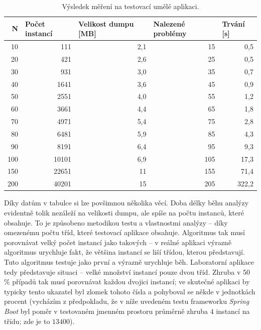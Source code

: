 \begin{table}[ht!]
    \begin{tabular}{|r|r|r|r|r|}
        \hline
    \multicolumn{1}{|r|}{\textbf{N}} & \multicolumn{1}{l|}{\textbf{Počet instancí}} & \multicolumn{1}{l|}{\textbf{Velikost dumpu {[}MB{]}}} & \multicolumn{1}{l|}{\textbf{Nalezené problémy}} & \multicolumn{1}{l|}{\textbf{Trvání {[}s{]}}} \\ \hline\hline
    10 & 111   & 2,1     & 15  & 0,5   \\ \hline
    20 & 421   & 2,6     & 25  & 0,5   \\ \hline
    30 & 931   & 3,0     & 35  & 0,7   \\ \hline
    40 & 1641  & 3,6     & 45  & 0,9   \\ \hline
    50 & 2551  & 4,0     & 55  & 1,2   \\ \hline
    60 & 3661  & 4,4     & 65  & 1,8   \\ \hline
    70 & 4971  & 5,4     & 75  & 2,8   \\ \hline
    80 & 6481  & 5,9     & 85  & 4,3   \\ \hline
    90 & 8191  & 6,4     & 95  & 9,3   \\ \hline
    100 & 10101 & 6,9& 105  & 17,3  \\ \hline
    150 & 22651 & 11 & 155  & 71,4 \\ \hline
    200 & 40201 & 15 & 205  & 322,2 \\ \hline                           
    \end{tabular}
    \caption{Výsledek měření na testovací umělé aplikaci.}
    \label{table-example-app-results}
\end{table}

Díky datům v tabulce si lze povšimnou několika věcí. Doba délky běhu analýzy evidentně tolik nezáleží na velikosti dumpu, ale spíše na počtu instanců, které obsahuje. To je způsobeno metodikou testu a vlastnostmi analýzy -- díky omezenému počtu tříd, které testovací aplikace obsahuje. Algoritmus tak musí porovnávat velký počet instancí jako takových -- v reálné aplikaci výrazně algoritmus urychluje fakt, že většina instancí se liší třídou, kterou představují. Tuto  algoritmus testuje jako první a výrazně urychluje běh. Laboratorní aplikace tedy představuje  situaci -- velké množství instancí pouze dvou tříd. Zhruba v 50 \% případů tak musí porovnávat každou dvojici instancí; ve skutečné aplikaci by typicky tento ukazatel byl zlomek tohoto čísla a pohyboval se někde v jednotkách procent (vycházím z předpokladu, že v níže uvedeném testu frameworku \textit{Spring Boot} byl poměr v testovaném jmenném prostoru průměrně zhruba $4$ instancí na třídu; zde je to $13400$).   

